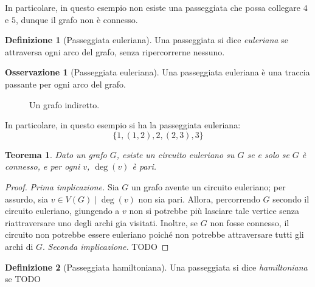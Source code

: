 \documentclass[14pt]{extreport}
\newtheorem{theorem}{Teorema}[section]
\theoremstyle{definition}
\newtheorem{definition}{Definizione}[section]
\theoremstyle{definition}
\newtheorem{remark}{Osservazione}[section]
\begin{document}
In particolare, in questo esempio non esiste una passeggiata che possa collegare $4$ e $5$, dunque il grafo non è connesso.

\begin{definition}[Passeggiata euleriana]
    Una passeggiata si dice \textit{euleriana} se attraversa ogni arco del grafo, senza ripercorrerne nessuno.
\end{definition}

\begin{remark}[Passeggiata euleriana]
    Una passeggiata euleriana è una traccia passante per ogni arco del grafo.
\end{remark}

\begin{figure}[!htbp]
    \centering
    \caption{Un grafo indiretto.}
\end{figure}

In particolare, in questo esempio si ha la passeggiata euleriana: $$\{1, (1,2), 2, (2,3), 3\}$$

\begin{theorem}
    Dato un grafo $G$, esiste un circuito euleriano su $G$ se e solo se $G$ è connesso, e per ogni $v$, $\deg(v)$ è pari.
\end{theorem}

\begin{proof}
    \textit{Prima implicazione.} Sia $G$ un grafo avente un circuito euleriano; per assurdo, sia $v \in V(G) \mid \deg(v)$ non sia pari. Allora, percorrendo $G$ secondo il circuito euleriano, giungendo a $v$ non si potrebbe più lasciare tale vertice senza riattraversare uno degli archi gia visitati. Inoltre, se $G$ non fosse connesso, il circuito non potrebbe essere euleriano poiché non potrebbe attraversare tutti gli archi di $G$. \textit{Seconda implicazione.} TODO
\end{proof}

\begin{definition}[Passeggiata hamiltoniana]
    Una passeggiata si dice \textit{hamiltoniana} se TODO
\end{definition}
\end{document}
